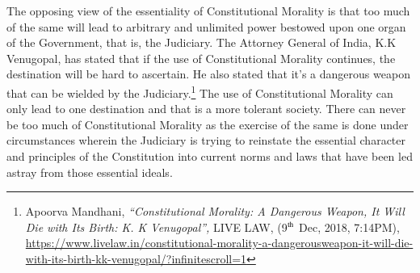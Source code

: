 \begin{multicols}{2}

\noi
The opposing view of the essentiality of Constitutional Morality is that too much of the same
will lead to arbitrary and unlimited power bestowed upon one organ of the Government, that
is, the Judiciary. The Attorney General of India, K.K Venugopal, has stated that if the use of Constitutional Morality continues, the destination will be hard to ascertain. He also stated that
it’s a dangerous weapon that can be wielded by the Judiciary.\footnote{Apoorva Mandhani, \textit{“Constitutional Morality: A Dangerous Weapon, It Will Die with Its Birth: K. K Venugopal”,} LIVE LAW, (9$^{\rm th}$ Dec, 2018, 7:14PM), \url{https://www.livelaw.in/constitutional-morality-a-dangerousweapon-it-will-die-with-its-birth-kk-venugopal/?infinitescroll=1}} The use of Constitutional
Morality can only lead to one destination and that is a more tolerant society. There can never
be too much of Constitutional Morality as the exercise of the same is done under
circumstances wherein the Judiciary is trying to reinstate the essential character and
principles of the Constitution into current norms and laws that have been led astray from
those essential ideals.



\end{multicols}
